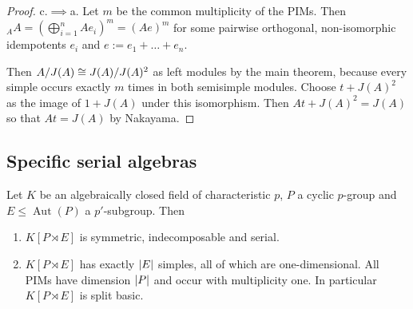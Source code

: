 \documentclass[fontsize=11pt,fleqn,a4paper]{scrartcl}
\begin{document}
\begin{proof}
\medbreak
c.$\implies$a. Let $m$ be the common multiplicity of the PIMs. Then ${_A A}=(\bigoplus_{i=1}^n Ae_i)^m=(Ae)^m$ for some pairwise orthogonal, non-isomorphic idempotents $e_i$ and $e:=e_1+\ldots+e_n$.

Then $A/J(A) \cong J(A)/J(A)^2$ as left modules by the main theorem, because every simple occurs exactly $m$ times in both semisimple modules. Choose $t+J(A)^2$ as the image of $1+J(A)$ under this isomorphism. Then $At+J(A)^2 = J(A)$ so that $At=J(A)$ by Nakayama.
\end{proof}

\subsection{Specific serial algebras}

\begin{theorem}[11.3.2]
Let $K$ be an algebraically closed field of characteristic $p$, $P$ a cyclic $p$-group and $E\leq\operatorname{Aut}(P)$ a $p'$-subgroup. Then
\begin{enumerate}
\item $K[P\rtimes E]$ is symmetric, indecomposable and serial.
\item $K[P\rtimes E]$ has exactly $\lvert E\rvert$ simples, all of which are one-dimensional. All PIMs have dimension $\lvert P\rvert$ and occur with multiplicity one. In particular $K[P\rtimes E]$ is split basic.
\end{enumerate}
\end{theorem}
\end{document}
